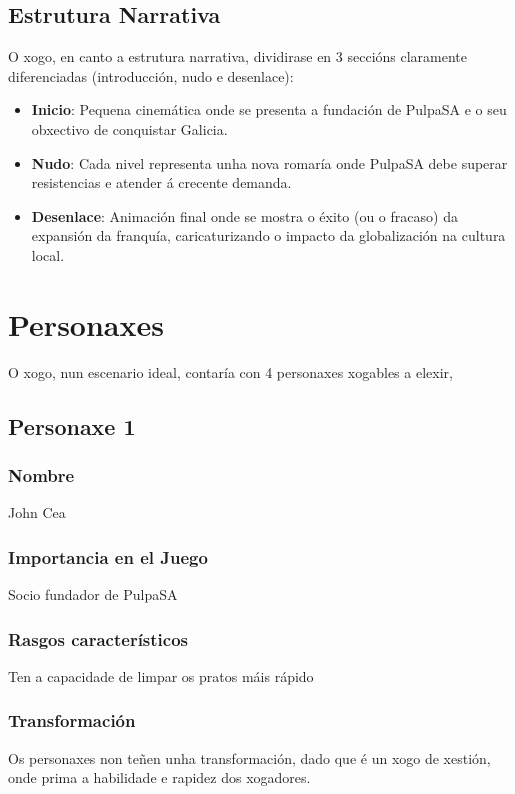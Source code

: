 \documentclass{report}  %
\begin{document}
\subsection{Estrutura Narrativa}

O xogo, en canto a estrutura narrativa, dividirase en 3 seccións claramente diferenciadas (introducción, nudo e desenlace):

\begin{itemize}
    \item \textbf{Inicio}: Pequena cinemática onde se presenta a fundación de PulpaSA e o seu obxectivo de conquistar Galicia.
    \item \textbf{Nudo}: Cada nivel representa unha nova romaría onde PulpaSA debe superar resistencias e atender á crecente demanda.
    \item \textbf{Desenlace}: Animación final onde se mostra o éxito (ou o fracaso) da expansión da franquía, caricaturizando o impacto da globalización na cultura local.
\end{itemize}


\newpage
\section{Personaxes}
O xogo, nun escenario ideal, contaría con 4 personaxes xogables a elexir,

\subsection{Personaxe 1}
\subsubsection{Nombre}
John Cea
\subsubsection{Importancia en el Juego}
Socio fundador de PulpaSA \footnotemark[1]
\subsubsection{Rasgos característicos}
Ten a capacidade de limpar os pratos máis rápido \footnotemark[2]
\subsubsection{Transformación}
Os personaxes non teñen unha transformación, dado que é un xogo de xestión, onde prima a habilidade e rapidez dos xogadores.
\end{document}
